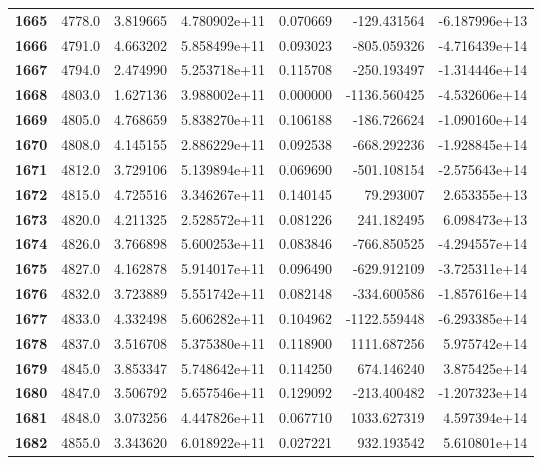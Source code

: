 \documentclass{report}[12pt]
\begin{document}
\begin{center}
\begin{tabular}{lrrrrrr}
\textbf{1665} &         4778.0 &   3.819665 &  4.780902e+11 &    0.070669 &  -129.431564 & -6.187996e+13 \\
\textbf{1666} &         4791.0 &   4.663202 &  5.858499e+11 &    0.093023 &  -805.059326 & -4.716439e+14 \\
\textbf{1667} &         4794.0 &   2.474990 &  5.253718e+11 &    0.115708 &  -250.193497 & -1.314446e+14 \\
\textbf{1668} &         4803.0 &   1.627136 &  3.988002e+11 &    0.000000 & -1136.560425 & -4.532606e+14 \\
\textbf{1669} &         4805.0 &   4.768659 &  5.838270e+11 &    0.106188 &  -186.726624 & -1.090160e+14 \\
\textbf{1670} &         4808.0 &   4.145155 &  2.886229e+11 &    0.092538 &  -668.292236 & -1.928845e+14 \\
\textbf{1671} &         4812.0 &   3.729106 &  5.139894e+11 &    0.069690 &  -501.108154 & -2.575643e+14 \\
\textbf{1672} &         4815.0 &   4.725516 &  3.346267e+11 &    0.140145 &    79.293007 &  2.653355e+13 \\
\textbf{1673} &         4820.0 &   4.211325 &  2.528572e+11 &    0.081226 &   241.182495 &  6.098473e+13 \\
\textbf{1674} &         4826.0 &   3.766898 &  5.600253e+11 &    0.083846 &  -766.850525 & -4.294557e+14 \\
\textbf{1675} &         4827.0 &   4.162878 &  5.914017e+11 &    0.096490 &  -629.912109 & -3.725311e+14 \\
\textbf{1676} &         4832.0 &   3.723889 &  5.551742e+11 &    0.082148 &  -334.600586 & -1.857616e+14 \\
\textbf{1677} &         4833.0 &   4.332498 &  5.606282e+11 &    0.104962 & -1122.559448 & -6.293385e+14 \\
\textbf{1678} &         4837.0 &   3.516708 &  5.375380e+11 &    0.118900 &  1111.687256 &  5.975742e+14 \\
\textbf{1679} &         4845.0 &   3.853347 &  5.748642e+11 &    0.114250 &   674.146240 &  3.875425e+14 \\
\textbf{1680} &         4847.0 &   3.506792 &  5.657546e+11 &    0.129092 &  -213.400482 & -1.207323e+14 \\
\textbf{1681} &         4848.0 &   3.073256 &  4.447826e+11 &    0.067710 &  1033.627319 &  4.597394e+14 \\
\textbf{1682} &         4855.0 &   3.343620 &  6.018922e+11 &    0.027221 &   932.193542 &  5.610801e+14 \\

\end{tabular}
\end{center}
\end{document}
